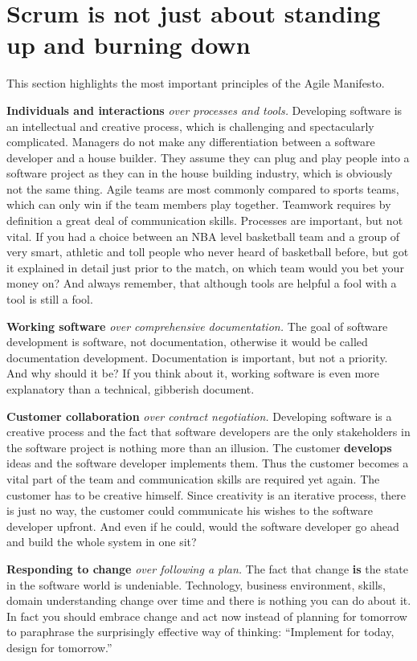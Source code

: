 \section{Scrum is not just about standing up and burning down}
This section highlights the most important principles of the Agile
Manifesto.

{\bf Individuals and interactions} \emph{over processes and tools.} Developing
software is an intellectual and creative process, which is challenging and spectacularly
complicated. Managers do not make any differentiation between a software
developer and a house builder. They assume they can plug and play people into a
software project as they can in the house building industry, which is obviously
not the same thing. Agile teams are most commonly compared to
sports teams, which can only win if the team members play together. Teamwork
requires by definition a great deal of communication skills. Processes are
important, but not vital. If you had a choice between an NBA level basketball
team and a group of very smart, athletic and toll people who never heard of
basketball before, but got it explained in detail just prior to the match, on
which team would you bet your money on? And always remember, that although tools
are helpful a fool with a tool is still a fool.

{\bf Working software} \emph{over comprehensive documentation.} The goal of
software development is software, not documentation, otherwise it would be called
documentation development.\cite{Ambler200204} Documentation is important, but
not a priority. And why should it be? If you think about it, working software is
even more explanatory than a technical, gibberish document.

{\bf Customer collaboration} \emph{over contract negotiation.} Developing software is a
creative process and the fact that software developers are the only stakeholders
in the software project is nothing more than an illusion. The customer {\bf
develops} ideas and the software developer implements them. Thus the customer
becomes a vital part of the team and communication skills are required yet
again. The customer has to be creative himself. Since creativity is an iterative
process, there is just no way, the customer could communicate his wishes to the
software developer upfront. And even if he could, would the software developer
go ahead and build the whole system in one sit?

{\bf Responding to change} \emph{over following a plan.} The fact that change {\bf is}
the state in the software world is undeniable. Technology, business environment,
skills, domain understanding change over time and there is nothing you can do
about it. In fact you should embrace change and act now instead of planning for
tomorrow to paraphrase the surprisingly effective way of thinking:
\enquote{Implement for today, design for tomorrow.}\cite{BeckAndres200411}

